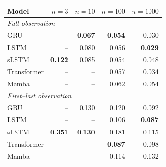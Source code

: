 \begin{tabular}{lrrrr}
\toprule
Model & $n{=}3$ & $n{=}10$ & $n{=}100$ & $n{=}1000$ \\
\midrule
\multicolumn{5}{l}{\emph{Full observation}} \\
GRU & -- & \textbf{0.067} & \textbf{0.054} & 0.030 \\
LSTM & -- & 0.080 & 0.056 & \textbf{0.029} \\
sLSTM & \textbf{0.122} & 0.085 & 0.054 & 0.048 \\
Transformer & -- & -- & 0.057 & 0.034 \\
Mamba & -- & -- & 0.062 & 0.054 \\
\midrule
\multicolumn{5}{l}{\emph{First--last observation}} \\
GRU & -- & 0.130 & 0.120 & 0.092 \\
LSTM & -- & -- & 0.106 & \textbf{0.087} \\
sLSTM & \textbf{0.351} & \textbf{0.130} & 0.181 & 0.115 \\
Transformer & -- & -- & \textbf{0.087} & 0.098 \\
Mamba & -- & -- & 0.114 & 0.132 \\
\bottomrule
\end{tabular}

